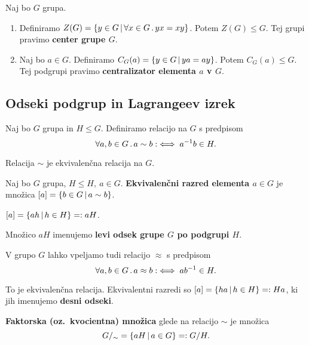 \begin{trditev}
    Naj bo $G$ grupa.
    \begin{enumerate}
        \item Definiramo $Z(G) = \{y \in G \,|\, \forall x \in G \,.\, yx=xy\}$. Potem $Z(G) \leq G$. Tej grupi pravimo \textbf{center grupe $G$}.
        \item Naj bo $a \in G$. Definiramo $C_G(a) = \{y \in G \,|\, ya = ay\}$. Potem $C_G(a) \leq G$. Tej podgrupi pravimo \textbf{centralizator elementa $a$ v $G$}.
    \end{enumerate}
\end{trditev}

\subsection{Odseki podgrup in Lagrangeev izrek}
Naj bo $G$ grupa in $H \leq G$. Definiramo relacijo na $G$ s predpisom $$\forall a, b \in G \,.\, a \sim b :\iff a^{-1}b \in H.$$

\begin{trditev}
    Relacija $\sim$ je ekvivalenčna relacija na $G$.
\end{trditev}

\begin{definicija}
    Naj bo $G$ grupa, $H \leq H, \ a \in G$. \textbf{Ekvivalenčni razred elementa $a \in G$} je množica $[a] = \{b \in G \,|\, a \sim b\}$.
\end{definicija}

\begin{opomba}
    $[a] = \{ah \,|\, h \in H\} =: aH$.
\end{opomba}

\begin{definicija}
    Množico $aH$ imenujemo \textbf{levi odsek grupe $G$ po podgrupi $H$}.
\end{definicija}

\begin{opomba}
    V grupo $G$ lahko vpeljamo tudi relacijo $\approx$ s predpisom $$\forall a, b \in G \,.\, a \approx b :\iff ab^{-1} \in H.$$

    To je ekvivalenčna relacija. Ekvivalentni razredi so $[a] = \{ha \,|\, h \in H\} =: Ha$, ki jih imenujemo \textbf{desni odseki}.
\end{opomba}

\begin{definicija}
    \textbf{Faktorska (oz.\ kvocientna) množica} glede na relacijo $\sim$ je množica $$G/_\sim = \{aH \,|\, a \in G\} =: G/H.$$
\end{definicija}

